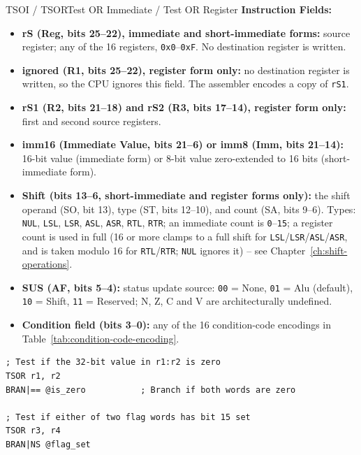 \begin{instructionbox}{TSOI / TSOR}{Test OR Immediate / Test OR Register}
	\textbf{Instruction Fields:}
	\begin{itemize}
		\item \textbf{rS (Reg, bits 25--22), immediate and short-immediate forms:} source register; any of the 16 registers,
		      \texttt{0x0}--\texttt{0xF}. No destination register is written.
		\item \textbf{ignored (R1, bits 25--22), register form only:} no destination register is written, so the CPU ignores
		      this field. The assembler encodes a copy of \texttt{rS1}.
		\item \textbf{rS1 (R2, bits 21--18) and rS2 (R3, bits 17--14), register form only:} first and second source registers.
		\item \textbf{imm16 (Immediate Value, bits 21--6) or imm8 (Imm, bits 21--14):} 16-bit value (immediate form) or 8-bit
		      value zero-extended to 16 bits (short-immediate form).
		\item \textbf{Shift (bits 13--6, short-immediate and register forms only):} the shift operand (SO, bit 13), type (ST, bits 12--10), and count (SA, bits 9--6). Types:
		      \texttt{NUL}, \texttt{LSL},
		      \texttt{LSR}, \texttt{ASL}, \texttt{ASR}, \texttt{RTL}, \texttt{RTR}; an immediate count is
		      \texttt{0}--\texttt{15}; a register count is used in full (16 or more clamps to a full shift for \texttt{LSL}/\texttt{LSR}/\texttt{ASL}/\texttt{ASR}, and is taken modulo 16 for \texttt{RTL}/\texttt{RTR}; \texttt{NUL} ignores it) -- see Chapter~\ref{ch:shift-operations}.
		\item \textbf{SUS (AF, bits 5--4):} status update source: \texttt{00} = None, \texttt{01} = Alu (default), \texttt{10} = Shift, \texttt{11} =
		      Reserved; N, Z, C and V are architecturally undefined.
		\item \textbf{Condition field (bits 3--0):} any of the 16 condition-code encodings in
		      Table~\ref{tab:condition-code-encoding}.
	\end{itemize}

	\begin{example}
		\begin{lstlisting}
; Test if the 32-bit value in r1:r2 is zero
TSOR r1, r2
BRAN|== @is_zero           ; Branch if both words are zero

; Test if either of two flag words has bit 15 set
TSOR r3, r4
BRAN|NS @flag_set
		\end{lstlisting}
		\caption{Testing Two Values at Once with TSO}
	\end{example}


\end{instructionbox}
